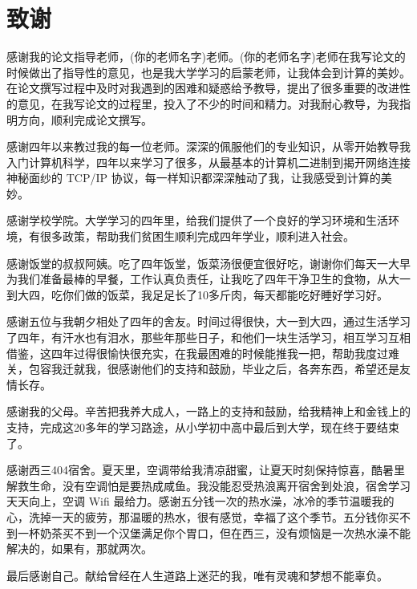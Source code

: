 \section*{致谢}

感谢我的论文指导老师，(你的老师名字)老师。(你的老师名字)老师在我写论文的时候做出了指导性的意见，也是我大学学习的启蒙老师，让我体会到计算的美妙。在论文撰写过程中及时对我遇到的困难和疑惑给予教导，提出了很多重要的改进性的意见，在我写论文的过程里，投入了不少的时间和精力。对我耐心教导，为我指明方向，顺利完成论文撰写。

感谢四年以来教过我的每一位老师。深深的佩服他们的专业知识，从零开始教导我入门计算机科学，四年以来学习了很多，从最基本的计算机二进制到揭开网络连接神秘面纱的 TCP/IP 协议，每一样知识都深深触动了我，让我感受到计算的美妙。

感谢学校学院。大学学习的四年里，给我们提供了一个良好的学习环境和生活环境，有很多政策，帮助我们贫困生顺利完成四年学业，顺利进入社会。

感谢饭堂的叔叔阿姨。吃了四年饭堂，饭菜汤很便宜很好吃，谢谢你们每天一大早为我们准备最棒的早餐，工作认真负责任，让我吃了四年干净卫生的食物，从大一到大四，吃你们做的饭菜，我足足长了10多斤肉，每天都能吃好睡好学习好。

感谢五位与我朝夕相处了四年的舍友。时间过得很快，大一到大四，通过生活学习了四年，有汗水也有泪水，那些年那些日子，和他们一块生活学习，相互学习互相借鉴，这四年过得很愉快很充实，在我最困难的时候能推我一把，帮助我度过难关，包容我迁就我，很感谢他们的支持和鼓励，毕业之后，各奔东西，希望还是友情长存。

感谢我的父母。辛苦把我养大成人，一路上的支持和鼓励，给我精神上和金钱上的支持，完成这20多年的学习路途，从小学初中高中最后到大学，现在终于要结束了。

感谢西三404宿舍。夏天里，空调带给我清凉甜蜜，让夏天时刻保持惊喜，酷暑里解救生命，没有空调怕是要热成咸鱼。我没能忍受热浪离开宿舍到处浪，宿舍学习天天向上，空调 Wifi 最给力。感谢五分钱一次的热水澡，冰冷的季节温暖我的心，洗掉一天的疲劳，那温暖的热水，很有感觉，幸福了这个季节。五分钱你买不到一杯奶茶买不到一个汉堡满足你个胃口，但在西三，没有烦恼是一次热水澡不能解决的，如果有，那就两次。

\newpage

最后感谢自己。献给曾经在人生道路上迷茫的我，唯有灵魂和梦想不能辜负。